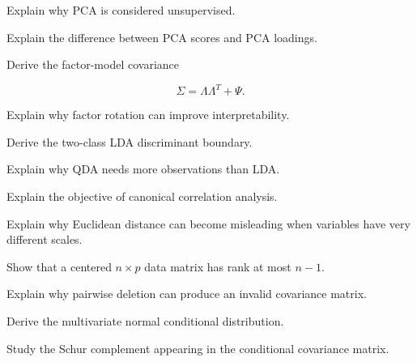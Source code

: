 \begin{exercise}[3]
Explain why PCA is considered unsupervised.
\end{exercise}

\begin{exercise}[3]
Explain the difference between PCA scores and PCA loadings.
\end{exercise}

\begin{exercise}[3]
Derive the factor-model covariance

\[
\Sigma
=
\Lambda\Lambda^T+\Psi.
\]
\end{exercise}

\begin{exercise}[3]
Explain why factor rotation can improve interpretability.
\end{exercise}

\begin{exercise}[3]
Derive the two-class LDA discriminant boundary.
\end{exercise}

\begin{exercise}[3]
Explain why QDA needs more observations than LDA.
\end{exercise}

\begin{exercise}[3]
Explain the objective of canonical correlation analysis.
\end{exercise}

\begin{exercise}[3]
Explain why Euclidean distance can become misleading when variables have
very different scales.
\end{exercise}

\begin{exercise}[3]
Show that a centered \(n\times p\) data matrix has rank at most \(n-1\).
\end{exercise}

\begin{exercise}[3]
Explain why pairwise deletion can produce an invalid covariance matrix.
\end{exercise}

\begin{exercise}[4]
Derive the multivariate normal conditional distribution.
\end{exercise}

\begin{exercise}[4]
Study the Schur complement appearing in the conditional covariance
matrix.
\end{exercise}


